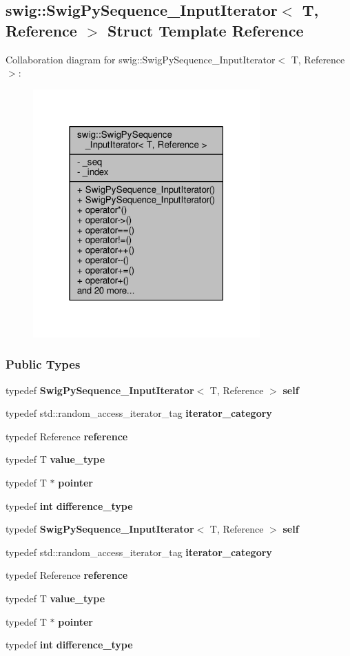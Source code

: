 \subsection{swig\+:\+:Swig\+Py\+Sequence\+\_\+\+Input\+Iterator$<$ T, Reference $>$ Struct Template Reference}
\label{structswig_1_1SwigPySequence__InputIterator}


Collaboration diagram for swig\+:\+:Swig\+Py\+Sequence\+\_\+\+Input\+Iterator$<$ T, Reference $>$\+:
\nopagebreak
\begin{figure}[H]
\begin{center}
\leavevmode
\includegraphics[width=247pt]{d7/dad/structswig_1_1SwigPySequence__InputIterator__coll__graph}
\end{center}
\end{figure}
\subsubsection*{Public Types}
\begin{DoxyCompactItemize}
\item 
typedef {\bf Swig\+Py\+Sequence\+\_\+\+Input\+Iterator}$<$ T, Reference $>$ {\bf self}
\item 
typedef std\+::random\+\_\+access\+\_\+iterator\+\_\+tag {\bf iterator\+\_\+category}
\item 
typedef Reference {\bf reference}
\item 
typedef T {\bf value\+\_\+type}
\item 
typedef T $\ast$ {\bf pointer}
\item 
typedef {\bf int} {\bf difference\+\_\+type}
\item 
typedef {\bf Swig\+Py\+Sequence\+\_\+\+Input\+Iterator}$<$ T, Reference $>$ {\bf self}
\item 
typedef std\+::random\+\_\+access\+\_\+iterator\+\_\+tag {\bf iterator\+\_\+category}
\item 
typedef Reference {\bf reference}
\item 
typedef T {\bf value\+\_\+type}
\item 
typedef T $\ast$ {\bf pointer}
\item 
typedef {\bf int} {\bf difference\+\_\+type}
\end{DoxyCompactItemize}
